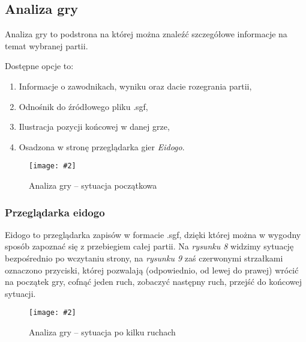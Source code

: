 \documentclass[10pt,leqno]{article}
\newcommand{\myimage}[3]{
  \begin{figure}[h!]
    \centering
      \texttt{[image: \#2]}
  \caption{#3}
  \end{figure}
}
\begin{document}
\subsection{Analiza gry}
Analiza gry to podstrona na której można znaleźć szczegółowe informacje na temat wybranej partii.

Dostępne opcje to:
\begin{enumerate}
\item Informacje o zawodnikach, wyniku oraz dacie rozegrania partii,
\item Odnośnik do źródłowego pliku .sgf,
\item Ilustracja pozycji końcowej w danej grze,
\item Osadzona w stronę przeglądarka gier \emph{Eidogo}.
\end{enumerate}

\myimage{0.47}{gameDetailsMain.png}{Analiza gry -- sytuacja początkowa}

\subsubsection{Przeglądarka eidogo}
  Eidogo to przeglądarka zapisów w formacie .sgf, dzięki której można w wygodny sposób zapoznać się z przebiegiem całej partii. 
  Na \emph{rysunku 8} widzimy sytuację bezpośrednio po wczytaniu strony, na \emph{rysunku 9} zaś czerwonymi strzałkami oznaczono przyciski,
  której pozwalają (odpowiednio, od lewej do prawej) wrócić na początek gry, cofnąć jeden ruch, zobaczyć następny ruch,
  przejść do końcowej sytuacji.
   
\myimage{0.47}{gameDetails.png}{Analiza gry -- sytuacja po kilku ruchach}

\end{document}
